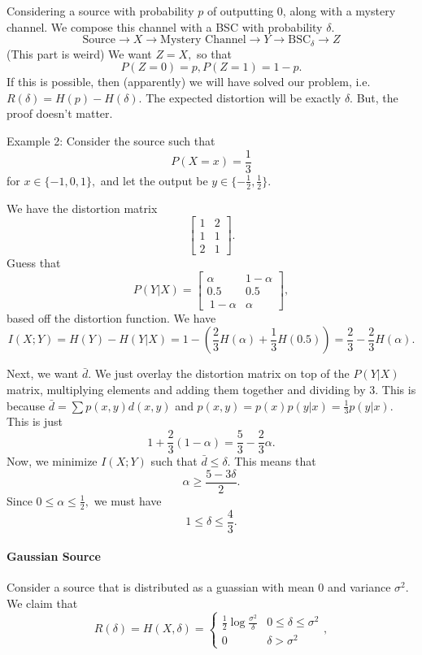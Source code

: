 \documentclass[12pt]{article}
\theoremstyle{remark}
\begin{document}
Considering a source with probability $p$ of outputting 0, along with a mystery channel. We compose this channel with a BSC with probability $\delta.$
\[\text{Source}\to X\to \text{Mystery Channel}\to Y\to\text{BSC}_\delta\to Z\]
(This part is weird) We want $Z=X,$ so that
\[P(Z=0)=p,P(Z=1)=1-p.\]
If this is possible, then (apparently) we will have solved our problem, i.e. $R(\delta)=H(p)-H(\delta).$ The expected distortion will be exactly $\delta.$ But, the proof doesn't matter.


Example 2:
Consider the source such that
\[P(X=x)=\frac{1}{3}\] for $x\in \{-1,0,1\},$ and let the output be $y\in\{-\frac{1}{2},\frac{1}{2}\}.$

We have the distortion matrix
\[\begin{bmatrix}
    1&2\\
    1&1\\
    2&1
\end{bmatrix}.\]
Guess that \[P(Y|X)=\begin{bmatrix}
    \alpha&1-\alpha\\
    0.5 &0.5\\\
    1-\alpha&\alpha
\end{bmatrix},\]
based off the distortion function. We have
\[I(X;Y)=H(Y)-H(Y|X)=1-\left(\frac{2}{3}H(\alpha)+\frac{1}{3}H(0.5)\right)=\frac{2}{3}-\frac{2}{3}H(\alpha).\]

Next, we want $\bar{d}.$ We just overlay the distortion matrix on top of the $P(Y|X)$ matrix, multiplying elements and adding them together and dividing by 3. This is because $\bar{d} = \sum p(x,y) d(x,y)$ and $p(x,y) = p(x) p(y|x) = \frac{1}{3} p(y|x)$. This is just \[1+\frac{2}{3}(1-\alpha)=\frac{5}{3}-\frac{2}{3}\alpha.\] Now, we minimize $I(X;Y)$ such that $\bar{d}\le\delta.$
This means that
\[\alpha\ge\frac{5-3\delta}{2}.\] Since $0\le \alpha\le \frac{1}{2},$ we must have
\[1\le\delta\le\frac{4}{3}.\]

\paragraph{Gaussian Source}
Consider a source that is distributed as a guassian with mean $0$ and variance $\sigma^2.$ We claim that
\[R(\delta)=H(X,\delta)=\begin{cases}
    \frac{1}{2}\log\frac{\sigma^2}{\delta}&0\le\delta\le\sigma^2\\
    0&\delta>\sigma^2
\end{cases},\]
\end{document}
